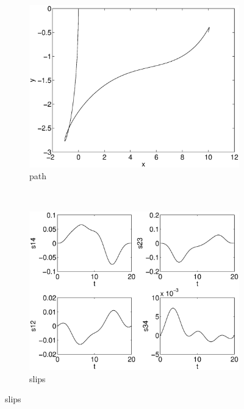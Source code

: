 \begin{figure}[h]
\begin{subfigure}[b]{0.45\textwidth}
\centering
\includegraphics[width=\textwidth]{img/manip_pltf_task_path.eps}
\caption{path}
\end{subfigure}
~
\begin{subfigure}[b]{0.45\textwidth}
\centering
\includegraphics[width=\textwidth]{img/manip_pltf_task_slips.eps}
\caption{slips}
\end{subfigure}


\end{figure}
